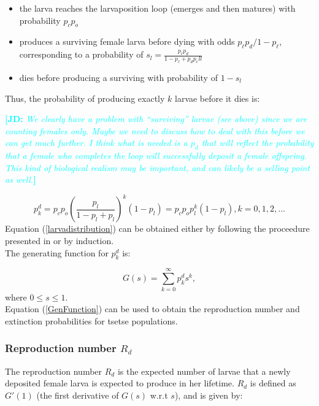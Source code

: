 \documentclass[smallextended]{svjour3}
\newcommand{\comment}[3]{\textcolor{#1}{\textbf{[#2: }\textit{#3}\textbf{]}}}
\newcommand{\jd}[1]{\comment{cyan}{JD}{#1}}
\begin{document}
\begin{itemize}
\item the larva reaches the larvaposition loop (emerges and then matures) with probability $p_c p_o$
\item produces a surviving female larva before dying with odds $p_\ell p_d / 1-p_\ell$, corresponding to a probability of $s_l = \frac{p_\ell p_d}{1 - p_\ell + p_d p_ell}$
\item dies before producing a surviving with probability of $1-s_l$
\end{itemize} 

Thus, the probability of producing exactly $k$ larvae before it dies is:

\jd{We clearly have a problem with ``surviving'' larvae (see above) since we are counting females only. Maybe we need to discuss how to deal with this before we can get much further. I think what is needed is a $p_d$ that will reflect the probability that a female who completes the loop will successfully deposit a female offspring. This kind of biological realism may be important, and can likely be a selling point as well.}

\begin{equation}
\label{larvadistribution}
p_{k}^{d} = p_{c}p_{o}(\frac{p_{l}}{1-p_{l} + p_{l}})^{k}(1-p_{l})= p_{c}p_{o}p_{l}^{k}(1-p_{l}), k =0,1,2,...
\end{equation} 
Equation (\ref{larvadistribution}) can be obtained either by following the proceedure presented in \cite{Kajunguri2019} or by induction.\\

The generating function for  $p_{k}^{d}$ is:

\begin{equation}
\label{GenFunction}
 G(s) = \sum_{k=0}^{\infty} p_{k}^{d}s^{k},  
\end{equation}
where $ 0\leq s \leq 1.$ \\

Equation (\ref{GenFunction}) can be used to obtain the reproduction number and extinction probabilities for tsetse populations. 

\subsubsection{Reproduction number $R_{d}$}

The reproduction number $R_{d}$ is the expected number of larvae that a newly deposited female larva is expected to produce in her lifetime. $R_{d}$ is defined as $G'(1)$ (the first derivative of $G(s)$ w.r.t $s$), and is given by:
\end{document}
